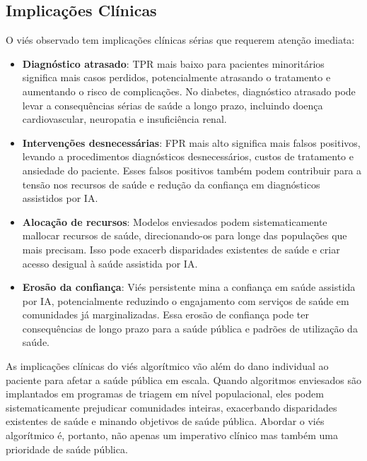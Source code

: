 \subsection{Implicações Clínicas}

O viés observado tem implicações clínicas sérias que requerem atenção 
imediata:

\begin{itemize}[leftmargin=*]
    \item \textbf{Diagnóstico atrasado}: TPR mais baixo para pacientes 
          minoritários significa mais casos perdidos, potencialmente 
          atrasando o tratamento e aumentando o risco de complicações. 
          No diabetes, diagnóstico atrasado pode levar a consequências 
          sérias de saúde a longo prazo, incluindo doença cardiovascular, 
          neuropatia e insuficiência renal.
    \item \textbf{Intervenções desnecessárias}: FPR mais alto significa 
          mais falsos positivos, levando a procedimentos diagnósticos 
          desnecessários, custos de tratamento e ansiedade do paciente. 
          Esses falsos positivos também podem contribuir para a tensão 
          nos recursos de saúde e redução da confiança em diagnósticos 
          assistidos por IA.
    \item \textbf{Alocação de recursos}: Modelos enviesados podem 
          sistematicamente mallocar recursos de saúde, direcionando-os 
          para longe das populações que mais precisam. Isso pode exacerb 
          disparidades existentes de saúde e criar acesso desigual à 
          saúde assistida por IA.
    \item \textbf{Erosão da confiança}: Viés persistente mina a confiança 
          em saúde assistida por IA, potencialmente reduzindo o engajamento 
          com serviços de saúde em comunidades já marginalizadas. Essa 
          erosão de confiança pode ter consequências de longo prazo para 
          a saúde pública e padrões de utilização da saúde.
\end{itemize}

As implicações clínicas do viés algorítmico vão além do dano individual 
ao paciente para afetar a saúde pública em escala. Quando algoritmos 
enviesados são implantados em programas de triagem em nível populacional, 
eles podem sistematicamente prejudicar comunidades inteiras, exacerbando 
disparidades existentes de saúde e minando objetivos de saúde pública. 
Abordar o viés algorítmico é, portanto, não apenas um imperativo clínico 
mas também uma prioridade de saúde pública.

